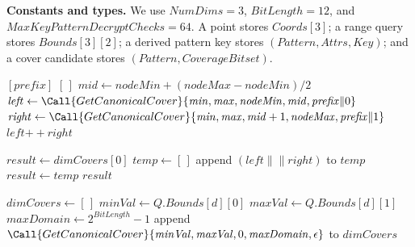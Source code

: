 
\noindent\textbf{Constants and types.}
We use $\mathit{NumDims}=3$, $\mathit{BitLength}=12$, and
$\mathit{MaxKeyPatternDecryptChecks}=64$.
A point stores $\mathit{Coords}[3]$; a range query stores
$\mathit{Bounds}[3][2]$; a derived pattern key stores
$(\mathit{Pattern}, \mathit{Attrs}, \mathit{Key})$; and a cover candidate
stores $(\mathit{Pattern}, \mathit{CoverageBitset})$.

\begin{algorithm}[t]
\caption{Query decomposition into wildcard patterns}
\begin{algorithmic}[1]
        \State \Return $[\mathit{prefix}]$
    \EndIf
        \State \Return $[\,]$
    \EndIf
    \State $\mathit{mid} \gets \mathit{nodeMin} + (\mathit{nodeMax}-\mathit{nodeMin})/2$
    \State $\mathit{left} \gets \Call{GetCanonicalCover}{\mathit{min}, \mathit{max}, \mathit{nodeMin}, \mathit{mid}, \mathit{prefix} \Vert 0}$
    \State $\mathit{right} \gets \Call{GetCanonicalCover}{\mathit{min}, \mathit{max}, \mathit{mid}+1, \mathit{nodeMax}, \mathit{prefix} \Vert 1}$
    \State \Return $\mathit{left} \mathbin{+\!\!+} \mathit{right}$
\EndProcedure

    \State $\mathit{result} \gets \mathit{dimCovers}[0]$
        \State $\mathit{temp} \gets [\,]$
                \State append $(\mathit{left} \mathbin{\| \|} \mathit{right})$ to $\mathit{temp}$
            \EndFor
        \EndFor
        \State $\mathit{result} \gets \mathit{temp}$
    \EndFor
    \State \Return $\mathit{result}$
\EndProcedure

    \State $\mathit{dimCovers} \gets [\,]$
        \State $\mathit{minVal} \gets Q.\mathit{Bounds}[d][0]$
        \State $\mathit{maxVal} \gets Q.\mathit{Bounds}[d][1]$
        \State $\mathit{maxDomain} \gets 2^{\mathit{BitLength}} - 1$
        \State append $\Call{GetCanonicalCover}{\mathit{minVal}, \mathit{maxVal}, 0, \mathit{maxDomain}, \epsilon}$ to $\mathit{dimCovers}$
    \EndFor
    \State \Return {}
\EndProcedure


\end{algorithmic}
\end{algorithm}
